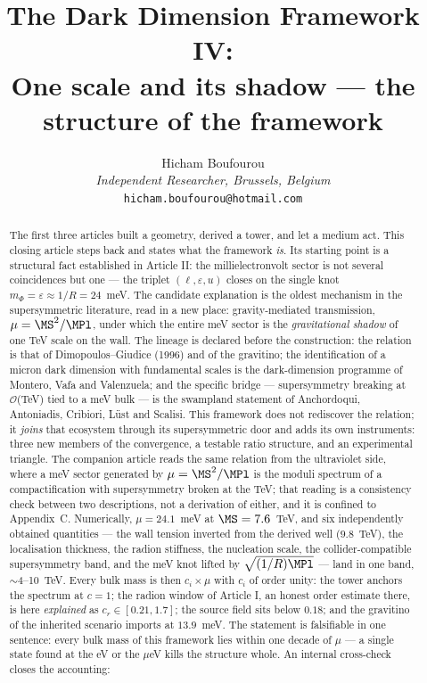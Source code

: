 
\graphicspath{{figures/}{../figures/}}
\title{\textbf{The Dark Dimension Framework IV:\\ One scale and its shadow --- the structure of the framework}}
\author{Hicham Boufourou\\ \small\textit{Independent Researcher, Brussels, Belgium}\\ \small\texttt{hicham.boufourou@hotmail.com}}
\maketitle
\begin{abstract}
\noindent The first three articles built a geometry, derived a tower, and let a medium act. This closing article steps back and states what the framework \emph{is}. Its starting point is a structural fact established in Article II: the millielectronvolt sector is not several coincidences but one --- the triplet $(\ell,\varepsilon,u)$ closes on the single knot $m_{\Phi}=\varepsilon\approx1/R=24$~meV. The candidate explanation is the oldest mechanism in the supersymmetric literature, read in a new place: gravity-mediated transmission, $\mu=\MS^{2}/\MPl$, under which the entire meV sector is the \emph{gravitational shadow} of one TeV scale on the wall. The lineage is declared before the construction: the relation is that of Dimopoulos--Giudice (1996) and of the gravitino; the identification of a micron dark dimension with fundamental scales is the dark-dimension programme of Montero, Vafa and Valenzuela; and the specific bridge --- supersymmetry breaking at $\mathcal{O}$(TeV) tied to a meV bulk --- is the swampland statement of Anchordoqui, Antoniadis, Cribiori, L\"ust and Scalisi. This framework does not rediscover the relation; it \emph{joins} that ecosystem through its supersymmetric door and adds its own instruments: three new members of the convergence, a testable ratio structure, and an experimental triangle. The companion article reads the same relation from the ultraviolet side, where a meV sector generated by $\mu=\MS^{2}/\MPl$ is the moduli spectrum of a compactification with supersymmetry broken at the TeV; that reading is a consistency check between two descriptions, not a derivation of either, and it is confined to Appendix~C. Numerically, $\mu=24.1$~meV at $\MS=7.6$~TeV, and six independently obtained quantities --- the wall tension inverted from the derived well ($9.8$~TeV), the localisation thickness, the radion stiffness, the nucleation scale, the collider-compatible supersymmetry band, and the meV knot lifted by $\sqrt{(1/R)\MPl}$ --- land in one band, $\sim$4--10~TeV. Every bulk mass is then $c_{i}\times\mu$ with $c_{i}$ of order unity: the tower anchors the spectrum at $c=1$; the radion window of Article I, an honest order estimate there, is here \emph{explained} as $c_{r}\in[0.21,1.7]$; the source field sits below $0.18$; and the gravitino of the inherited scenario imports at $13.9$~meV. The statement is falsifiable in one sentence: every bulk mass of this framework lies within one decade of $\mu$ --- a single state found at the eV or the $\mu$eV kills the structure whole. An internal cross-check closes the accounting: 
\end{abstract}

